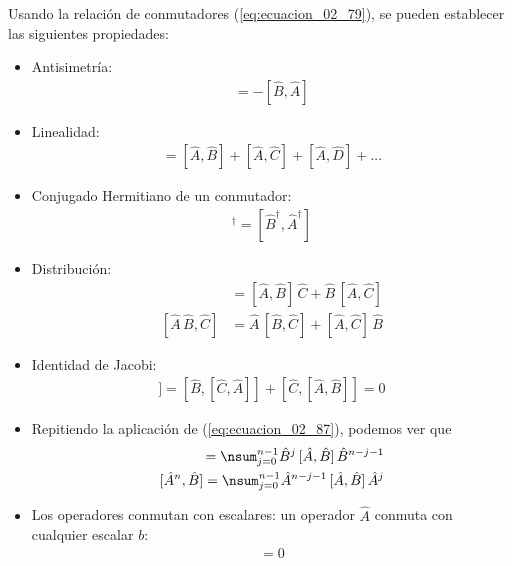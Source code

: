 Usando la relación de conmutadores (\ref{eq:ecuacion_02_79}), se pueden establecer las siguientes propiedades:
\begin{itemize}
\item Antisimetría:
\begin{align}
[\hat{A}, \hat{B}] = - [\hat{B}, \hat{A}]
\label{eq:ecuacion_02_84}
\end{align}
\item Linealidad:
\begin{align}
[\hat{A} + \hat{B} + \hat{C} + \hat{D} + \ldots] = [\hat{A} , \hat{B}] + [\hat{A} , \hat{C}] + [\hat{A} , \hat{D}] + \ldots
\label{eq:ecuacion_02_85} 
\end{align}
\item Conjugado Hermitiano de un conmutador:
\begin{align}
[\hat{A}, \hat{B}]^{\dagger} = [\hat{B}^{\dagger}, \hat{A}^{\dagger}]
\label{eq:ecuacion_02_86}
\end{align}
\item Distribución:
\begin{align}
[\hat{A},  \hat{B} \, \hat{C}] &= [\hat{A} , \hat{B}] \,  \hat{C} + \hat{B} \, [\hat{A} , \hat{C}]
\label{eq:ecuacion_02_87} \\[1em]
[\hat{A} \, \hat{B} , \hat{C}] &= \hat{A} \,[ \hat{B} ,  \hat{C}] + [\hat{A} , \hat{C}] \, \hat{B}
\label{eq:ecuacion_02_88}
\end{align}
\item Identidad de Jacobi:
\begin{align}
[\hat{A},  [\hat{B} , \hat{C}]] = [\hat{B}, [\hat{C} , \hat{A}]] + [\hat{C},  [\hat{A} , \hat{B}]] = 0
\label{eq:ecuacion_02_89}
\end{align}
\item Repitiendo la aplicación de (\ref{eq:ecuacion_02_87}), podemos ver que
\begin{align}
[\hat{A},  \hat{B}^{n}] = \nsum_{j=0}^{n-1} \hat{B}^{j} \, [\hat{A},  \hat{B}] \, \hat{B}^{n-j-1} \label{eq:ecuacion_02_90} \\
[\hat{A}^{n},  \hat{B}] = \nsum_{j=0}^{n-1} \hat{A}^{n-j-1} \, [\hat{A},  \hat{B}] \, \hat{A}^{j} \label{eq:ecuacion_02_91}
\end{align}
\item Los operadores conmutan con escalares: un operador $\hat{A}$ conmuta con cualquier escalar $b$:
\begin{align}
[ \hat{A}, b ] = 0
\label{eq:ecuacion_02_92}
\end{align}
\end{itemize}

